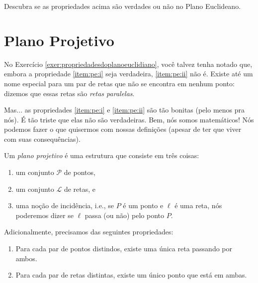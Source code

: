 \begin{exer} \label{exer:propriedadesdoplanoeuclidiano}
	Descubra se as propriedades acima são verdades ou não no Plano Euclideano.
\end{exer}

\section{Plano Projetivo}

No Exercício \ref{exer:propriedadesdoplanoeuclidiano}, você talvez tenha notado que, embora a propriedade \ref{item:pe:i} seja verdadeira, \ref{item:pe:ii} não é.
Existe até um nome especial para um par de retas que não se encontra em nenhum ponto: dizemos que essas retas são \emph{retas paralelas}.



Mas... as propriedades \ref{item:pe:i} e \ref{item:pe:ii} são tão bonitas (pelo menos pra nós).
É tão triste que elas não são verdadeiras.
Bem, nós somos matemáticos!
Nós podemos fazer o que quisermos com nossas definições (apesar de ter que viver com suas consequências).

\begin{pdefn}
	Um \emph{plano projetivo} é uma estrutura que consiste em três coisas:
	\begin{enumerate}[label = \textbullet]
		\item um conjunto \(\mathcal P\) de pontos,
		\item um conjunto \(\mathcal L\) de retas, e
		\item uma noção de incidência, i.e., se \(P\) é um ponto e \(\ell\) é uma reta, nós poderemos dizer se \(\ell\) passa (ou não) pelo ponto \(P\).
	\end{enumerate}

	Adicionalmente, precisamos das seguintes propriedades:
	\begin{enumerate}[label = (\textit{\roman*})]
		\item Para cada par de pontos distindos, existe uma única reta passando por ambos. \label{item:pp:i}
		\item Para cada par de retas distintas, existe um único ponto que está em ambas. \label{item:pp:ii}
	\end{enumerate}
\end{pdefn}
